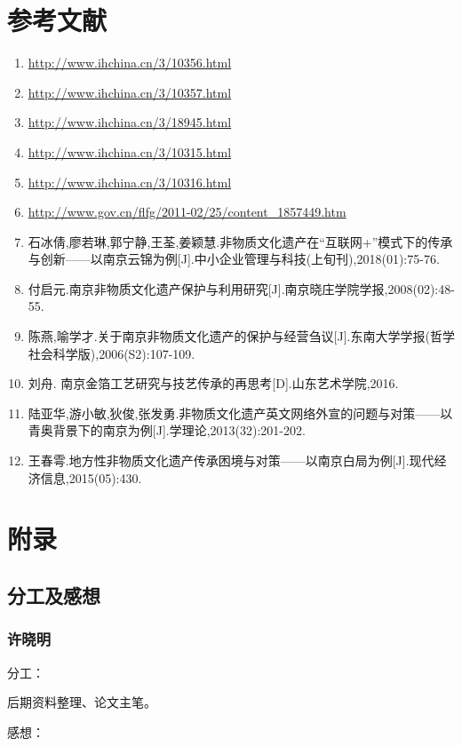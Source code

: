 \documentclass[12pt]{article}%
\begin{document}
\section{参考文献}
\begin{enumerate} [1 ]
  \item  \url{http://www.ihchina.cn/3/10356.html}
  \item  \url{http://www.ihchina.cn/3/10357.html}
  \item  \url{http://www.ihchina.cn/3/18945.html}
  \item  \url{http://www.ihchina.cn/3/10315.html}
  \item  \url{http://www.ihchina.cn/3/10316.html}
  \item  \url{http://www.gov.cn/flfg/2011-02/25/content_1857449.htm}
  \item  石冰倩,廖若琳,郭宁静,王荃,姜颖慧.非物质文化遗产在“互联网+”模式下的传承与创新——以南京云锦为例[J].中小企业管理与科技(上旬刊),2018(01):75-76.
  \item  付启元.南京非物质文化遗产保护与利用研究[J].南京晓庄学院学报,2008(02):48-55.
  \item  陈燕,喻学才.关于南京非物质文化遗产的保护与经营刍议[J].东南大学学报(哲学社会科学版),2006(S2):107-109.
  \item  刘舟. 南京金箔工艺研究与技艺传承的再思考[D].山东艺术学院,2016.
  \item  陆亚华,游小敏,狄俊,张发勇.非物质文化遗产英文网络外宣的问题与对策——以青奥背景下的南京为例[J].学理论,2013(32):201-202.
  \item  王春雩.地方性非物质文化遗产传承困境与对策——以南京白局为例[J].现代经济信息,2015(05):430.
\end{enumerate}



\section{附录}

\subsection{分工及感想}

\subsubsection{许晓明}

分工：

后期资料整理、论文主笔。

感想：
\end{document}
